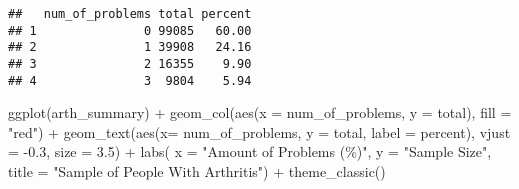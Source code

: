 \documentclass[
]{article}
\newenvironment{Shaded}{\begin{snugshade}}{\end{snugshade}}
\newcommand{\AttributeTok}[1]{\textcolor[rgb]{0.77,0.63,0.00}{#1}}
\newcommand{\DecValTok}[1]{\textcolor[rgb]{0.00,0.00,0.81}{#1}}
\newcommand{\FloatTok}[1]{\textcolor[rgb]{0.00,0.00,0.81}{#1}}
\newcommand{\FunctionTok}[1]{\textcolor[rgb]{0.00,0.00,0.00}{#1}}
\newcommand{\NormalTok}[1]{#1}
\newcommand{\OtherTok}[1]{\textcolor[rgb]{0.56,0.35,0.01}{#1}}
\newcommand{\SpecialCharTok}[1]{\textcolor[rgb]{0.00,0.00,0.00}{#1}}
\newcommand{\StringTok}[1]{\textcolor[rgb]{0.31,0.60,0.02}{#1}}
\begin{document}
\begin{Shaded}
\end{Shaded}

\begin{verbatim}
##   num_of_problems total percent
## 1               0 99085   60.00
## 2               1 39908   24.16
## 3               2 16355    9.90
## 4               3  9804    5.94
\end{verbatim}

\begin{Shaded}
\begin{Highlighting}[]
\FunctionTok{ggplot}\NormalTok{(arth\_summary) }\SpecialCharTok{+}
  \FunctionTok{geom\_col}\NormalTok{(}\FunctionTok{aes}\NormalTok{(}\AttributeTok{x =}\NormalTok{ num\_of\_problems, }\AttributeTok{y =}\NormalTok{ total), }\AttributeTok{fill =} \StringTok{"red"}\NormalTok{) }\SpecialCharTok{+}
  \FunctionTok{geom\_text}\NormalTok{(}\FunctionTok{aes}\NormalTok{(}\AttributeTok{x=}\NormalTok{ num\_of\_problems, }\AttributeTok{y =}\NormalTok{ total, }\AttributeTok{label =}\NormalTok{ percent), }\AttributeTok{vjust =} \SpecialCharTok{{-}}\FloatTok{0.3}\NormalTok{, }\AttributeTok{size =} \FloatTok{3.5}\NormalTok{) }\SpecialCharTok{+}
  \FunctionTok{labs}\NormalTok{( }\AttributeTok{x =} \StringTok{"Amount of Problems (\%)"}\NormalTok{,}
        \AttributeTok{y =} \StringTok{"Sample Size"}\NormalTok{,}
        \AttributeTok{title =} \StringTok{"Sample of People With Arthritis"}\NormalTok{) }\SpecialCharTok{+}
  \FunctionTok{theme\_classic}\NormalTok{()}
\end{Highlighting}
\end{Shaded}
\end{document}
